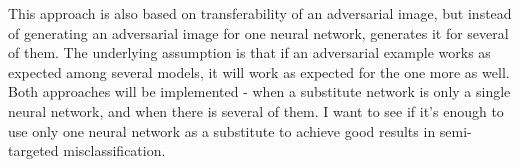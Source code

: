This approach is also based on transferability of an adversarial image, but instead of generating an adversarial image for one neural network, generates it for several of them. The underlying assumption is that if an adversarial example works as expected among several models, it will work as expected for the one more as well. Both approaches will be implemented - when a substitute network is only a single neural network, and when there is several of them. I want to see if it's enough to use only one neural network as a substitute to achieve good results in semi-targeted misclassification.
